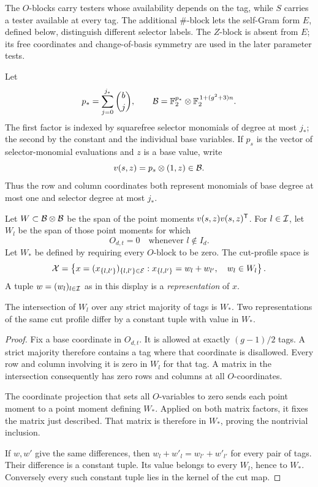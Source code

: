 The \(O\)-blocks carry testers whose availability depends on the tag,
while \(S\) carries a tester available at every tag.
The additional \(\#\)-block lets the self-Gram form \(E\), defined
below, distinguish different selector labels.
The \(Z\)-block is absent from \(E\); its free coordinates and
change-of-basis symmetry are used in the later parameter tests.

Let
\[
 p_*=\sum_{j=0}^{j_*}\binom bj,\qquad
 \mathcal B=\mathbb F_2^{p_*}\otimes\mathbb F_2^{\,1+(g^2+3)n}.
\]
The first factor is indexed by squarefree selector monomials of degree at most \(j_*\); the second by the constant and the individual base variables.
If \(p_s\) is the vector of selector-monomial evaluations and \(z\) is a base value, write
\begin{equation}\label{eq:point-evaluation}
 v(s,z)=p_s\otimes(1,z)\in\mathcal B.
\end{equation}
Thus the row and column coordinates both represent monomials of base degree at most one and selector degree at most \(j_*\).

Let \(W\subset\mathcal B\otimes\mathcal B\) be the span of the point moments \(v(s,z)v(s,z)^{\mathsf T}\).
For \(l\in\mathcal I\), let \(W_l\) be the span of those point moments for which
\[
 O_{d,t}=0\quad\text{whenever }l\notin I_d.
\]
Let \(W_*\) be defined by requiring every \(O\)-block to be zero.
The cut-profile space is
\begin{equation}\label{eq:cut-profile-space}
 \mathcal X=
 \left\{x=(x_{\{l,l'\}})_{\{l,l'\}\in\mathcal E}:
 x_{\{l,l'\}}=w_l+w_{l'},\quad w_l\in W_l\right\}.
\end{equation}
A tuple \(w=(w_l)_{l\in\mathcal I}\) as in this display is a \emph{representation} of \(x\).

\begin{lemma}\label{lem:cut-kernel}
The intersection of \(W_l\) over any strict majority of tags is \(W_*\).
Two representations of the same cut profile differ by a constant tuple with value in \(W_*\).
\end{lemma}
\begin{proof}
Fix a base coordinate in \(O_{d,t}\).  It is allowed at exactly \((g-1)/2\) tags.
A strict majority therefore contains a tag where that coordinate is disallowed.
Every row and column involving it is zero in \(W_l\) for that tag.
A matrix in the intersection consequently has zero rows and columns at all \(O\)-coordinates.

The coordinate projection that sets all \(O\)-variables to zero sends each point moment to a point moment defining \(W_*\).
Applied on both matrix factors, it fixes the matrix just described.
That matrix is therefore in \(W_*\), proving the nontrivial inclusion.

If \(w,w'\) give the same differences, then
\(w_l+w'_l=w_{l'}+w'_{l'}\) for every pair of tags.
Their difference is a constant tuple.  Its value belongs to every \(W_l\), hence to \(W_*\).
Conversely every such constant tuple lies in the kernel of the cut map.
\end{proof}

